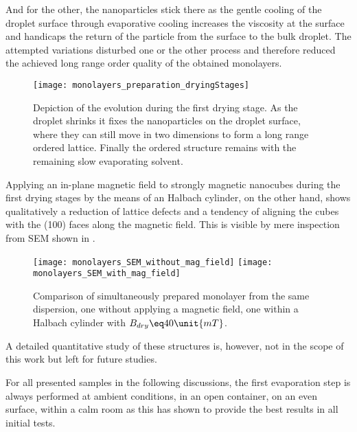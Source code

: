 \documentclass[\main/dresen_thesis.tex]{subfiles}
\begin{document}
    And for the other, the nanoparticles stick there as the gentle cooling of the droplet surface through evaporative cooling increases the viscosity at the surface and handicaps the return of the particle from the surface to the bulk droplet.
    The attempted variations disturbed one or the other process and therefore reduced the achieved long range order quality of the obtained monolayers.
    \begin{figure}[tb]
      \centering
      \texttt{[image: monolayers\_preparation\_dryingStages]}
      \caption{\label{fig:monolayers:preparation:dryingConditions:dryingStages} Depiction of the evolution during the first drying stage. As the droplet shrinks it fixes the nanoparticles on the droplet surface, where they can still move in two dimensions to form a long range ordered lattice. Finally the ordered structure remains with the remaining slow evaporating solvent.}
    \end{figure}

    Applying an in-plane magnetic field to strongly magnetic nanocubes during the first drying stages by the means of an Halbach cylinder, on the other hand, shows qualitatively a reduction of lattice defects and a tendency of aligning the cubes with the (100) faces along the magnetic field.
    This is visible by mere inspection from SEM shown in .
    \begin{figure}[tb]
      \centering
      \texttt{[image: monolayers\_SEM\_without\_mag\_field]}
      \texttt{[image: monolayers\_SEM\_with\_mag\_field]}
      \caption{\label{fig:monolayers:preparation:dryingConditions:magneticField}Comparison of simultaneously prepared monolayer from the same dispersion, one without applying a magnetic field, one within a Halbach cylinder with $B_{dry} \eq 40 \unit{mT}$.}
    \end{figure}
    A detailed quantitative study of these structures is, however, not in the scope of this work but left for future studies.

    For all presented samples in the following discussions, the first evaporation step is always performed at ambient conditions, in an open container, on an even surface, within a calm room as this has shown to provide the best results in all initial tests.
\end{document}
